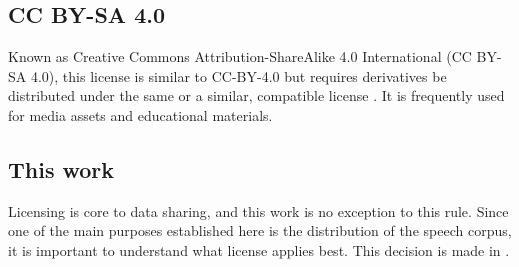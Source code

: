 \subsection{CC BY-SA 4.0}

Known as Creative Commons Attribution-ShareAlike 4.0 International (CC BY-SA 4.0), this license is similar to CC-BY-4.0 but requires derivatives be distributed under the same or a similar, compatible license \cite{licenses-ccby-sa40}. It is frequently used for media assets and educational materials.

\subsection{This work}

Licensing is core to data sharing, and this work is no exception to this rule. Since one of the main purposes established here is the distribution of the speech corpus, it is important to understand what license applies best. This decision is made in \cite{sec:proposal-data-publication}.